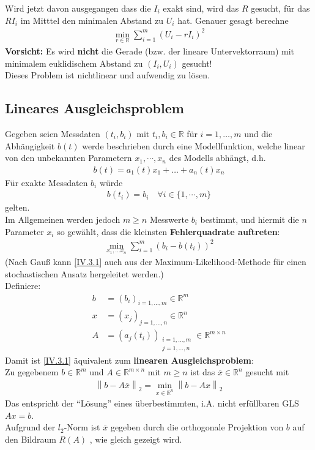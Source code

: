 \documentclass[ngerman,fontsize=11pt, paper=a4, parskip=half, titlepage=true, toc=bib]{scrbook}
\newcommand{\R}{\mathds{R}}
\newcommand{\nn}[1]{\left\| #1 \right\|}
\begin{document}
	
	Wird jetzt davon ausgegangen dass die $I_i$ exakt sind, wird das $R$ gesucht, 
	für das $RI_i$ im Mitttel den minimalen Abstand zu $U_i$ hat.
	Genauer gesagt berechne
	\begin{gather*}
		\min_{r\in\R} \sum_{i=1}^{m}(U_i-rI_i)^2
	\end{gather*}
	\textbf{Vorsicht: } Es wird \textbf{nicht} die Gerade (bzw. der lineare Untervektorraum) mit 
	minimalem euklidischem Abstand zu $(I_i,U_i)$ gesucht! \\
	Dieses Problem ist nichtlinear und aufwendig zu lösen.\\
	

	
	\subsection{Lineares Ausgleichsproblem} 
	Gegeben seien Messdaten $(t_i, b_i)$ mit $t_i, b_i\in \R$ für $i=1, \dots, m$ 
	und die Abhängigkeit $b(t)$ werde beschrieben durch eine Modellfunktion,
	 welche linear von den unbekannten Parametern $x_1, \cdots, x_n$ des Modells abhängt,
	 d.h.
	 \begin{gather*}
	 	b(t) = a_1(t)x_1 + \dots + a_n(t) x_n
	 \end{gather*}
	Für exakte Messdaten $b_i$ würde 
	\begin{gather*}
		b(t_i) = b_i \quad \forall i\in\{1,\cdots , m\}
	\end{gather*}
	gelten.\\
	Im Allgemeinen werden jedoch $m\geq n $ Messwerte $b_i$ bestimmt,
	und hiermit die $n$ Parameter $x_i$ so gewählt, dass die kleinsten
	\textbf{Fehlerquadrate auftreten}:
	\begin{gather}
		\min_{x_1, \dots x_n} \sum_{i=1}^{m} (b_i-b(t_i))^2 \label{IV.3.1}
	\end{gather}
	(Nach Gauß kann \eqref{IV.3.1} auch aus der Maximum-Likelihood-Methode
	für einen stochastischen Ansatz hergeleitet werden.)\\
		
	Definiere:
	\begin{align*}
		b &= (b_i)_{i=1,\dots, m}\in \R^m \\
		x &= (x_j)_{j=1,\dots, n}\in \R^n \\
		A &= (a_j(t_i)) _{\substack{i=1,\dots, m \\ j= 1, \dots, n}} \in \R^{m\times n}
	\end{align*}
	Damit ist \eqref{IV.3.1} äquivalent zum \textbf{linearen Ausgleichsproblem}:\\
	Zu gegebenem $b\in\R^m$ und $A\in\R^{m\times n}$ mit $m\geq n$
	ist das $\overline{x} \in \R^n$ gesucht mit 
	\begin{gather}
		\nn{b-A\overline{x}}_2 = \min_{x\in\R^n} \nn{b-Ax}_2
		\label{IV.3.2}
	\end{gather}
	Das entspricht der \enquote{Lösung} eines überbestimmten, i.A. nicht erfüllbaren
	GLS $Ax=b$.\\
	Aufgrund der $l_2$-Norm ist $\overline{x}$ gegeben durch die 
	orthogonale Projektion von $b$ auf den Bildraum $R(A) $ , wie gleich gezeigt wird. \\
	
\end{document}
